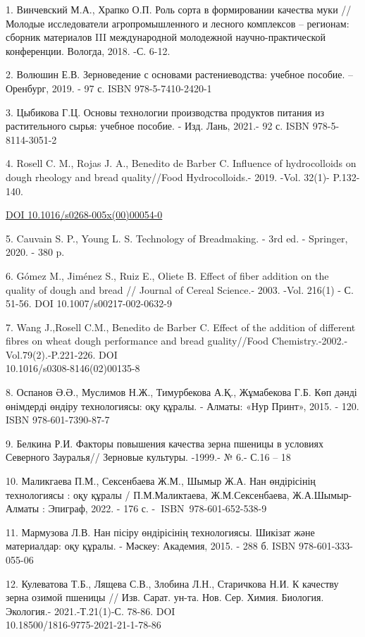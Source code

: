 \begin{references}
1. Винчевский М.А., Храпко О.П. Роль сорта в формировании качества муки
// Молодые исследователи агропромышленного и лесного комплексов --
регионам: сборник материалов III международной молодежной
научно-практической конференции. Вологда, 2018. -С. 6-12.

2. Волюшин Е.В. Зерноведение с основами растениеводства: учебное пособие.
-- Оренбург, 2019. - 97 с. ISBN 978-5-7410-2420-1

3. Цыбикова Г.Ц. Основы технологии производства продуктов питания из
растительного сырья: учебное пособие. - Изд. Лань, 2021.- 92 с. ISBN
978-5-8114-3051-2

4. Rosell C. M., Rojas J. A., Benedito de Barber C. Influence of
hydrocolloids on dough rheology and bread quality//Food Hydrocolloids.-
2019. -Vol. 32(1)- P.132-140.

\href{https://doi.org/10.1016/s0268-005x(00)00054-0}{DOI
10.1016/s0268-005x(00)00054-0}

5. Cauvain S. P., Young L. S. Technology of Breadmaking. - 3rd ed. -
Springer, 2020. - 380 p.

6. Gómez M., Jiménez S., Ruiz E., Oliete B. Effect of fiber addition on
the quality of dough and bread // Journal of Cereal Science.- 2003.
-Vol. 216(1) - С. 51-56. DOI 10.1007/s00217-002-0632-9

7. Wang J.,Rosell C.M., Benedito de Barber C. Effect of the addition of
different fibres on wheat dough performance and bread guality//Food
Chemistry.-2002.-Vol.79(2).-P.221-226. DOI \\10.1016/s0308-8146(02)00135-8

8. Оспанов Ә.Ә., Муслимов Н.Ж., Тимурбекова А.Қ., Жұмабекова Г.Б. Көп
дәнді өнімдерді өндіру технологиясы: оқу құралы. - Алматы: «Нур Принт»,
2015. - 120. ISBN 978-601-7390-87-7

9. Белкина Р.И. Факторы повышения качества зерна пшеницы в условиях
Северного Зауралья// Зерновые культуры. -1999.- № 6.- С.16 -- 18

10. Маликгаева П.М., Сексенбаева Ж.М., Шымыр Ж.А. Нан өндірісінің
технологиясы : оқу құралы / П.М.Маликтаева, Ж.М.Сексенбаева, Ж.А.Шымыр-
Алматы : Эпиграф, 2022. - 176 с. -{\bfseries ~}ISBN~978-601-652-538-9

11. Мармузова Л.В. Нан пісіру өндірісінің технологиясы. Шикізат және
материалдар: оқу құралы. - Мәскеу: Академия, 2015. - 288 б. ISBN 978-601-333-055-06

12. Кулеватова Т.Б., Лящева С.В., Злобина Л.Н., Старичкова Н.И. К
качеству зерна озимой пшеницы // Изв. Сарат. ун-та. Нов. Сер. Химия.
Биология. Экология.- 2021.-Т.21(1)-С. 78-86. DOI\\
10.18500/1816-9775-2021-21-1-78-86


\end{references}
